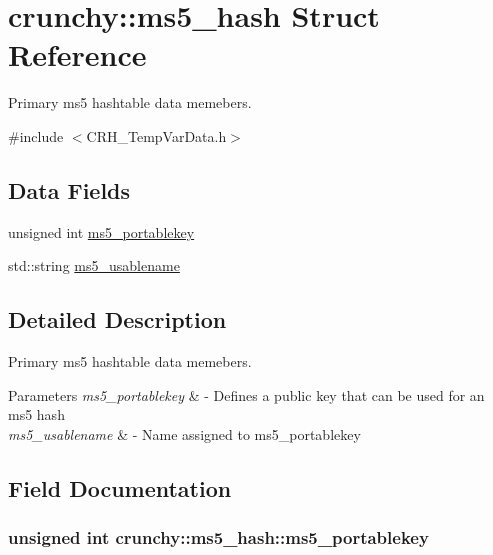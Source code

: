 \hypertarget{structcrunchy_1_1ms5__hash}{}\section{crunchy\+:\+:ms5\+\_\+hash Struct Reference}
\label{structcrunchy_1_1ms5__hash}


Primary ms5 hashtable data memebers.  




{\ttfamily \#include $<$C\+R\+H\+\_\+\+Temp\+Var\+Data.\+h$>$}

\subsection*{Data Fields}
\begin{DoxyCompactItemize}
\item 
unsigned int \hyperlink{structcrunchy_1_1ms5__hash_ac9cfaf8430a5d1da38684a28314b11e2}{ms5\+\_\+portablekey}
\item 
std\+::string \hyperlink{structcrunchy_1_1ms5__hash_a375a1251bbe67bb9928f1b4154154ef0}{ms5\+\_\+usablename}
\end{DoxyCompactItemize}


\subsection{Detailed Description}
Primary ms5 hashtable data memebers. 


\begin{DoxyParams}{Parameters}
{\em ms5\+\_\+portablekey} & -\/ Defines a public key that can be used for an ms5 hash \\
\hline
{\em ms5\+\_\+usablename} & -\/ Name assigned to ms5\+\_\+portablekey \\
\hline
\end{DoxyParams}


\subsection{Field Documentation}
\subsubsection[{ms5\+\_\+portablekey}]{\setlength{\rightskip}{0pt plus 5cm}unsigned int crunchy\+::ms5\+\_\+hash\+::ms5\+\_\+portablekey}\hypertarget{structcrunchy_1_1ms5__hash_ac9cfaf8430a5d1da38684a28314b11e2}{}\label{structcrunchy_1_1ms5__hash_ac9cfaf8430a5d1da38684a28314b11e2}
